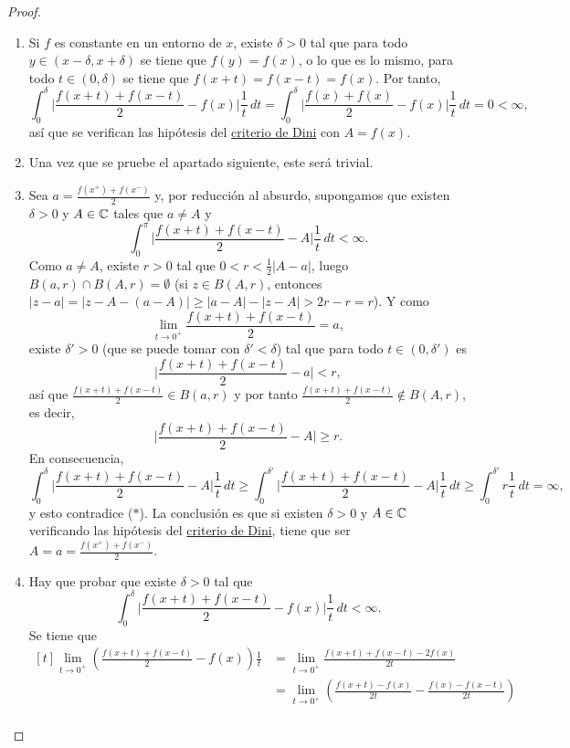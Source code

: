 \documentclass[a4paper, 11pt, oneside]{report}
\begin{document}
\begin{proof}
  \hfill
  \begin{enumerate}
    \item Si $f$ es constante en un entorno de $x$, existe $\delta>0$ tal que para todo $y \in (x-\delta,x+\delta)$ se tiene que $f(y)=f(x)$, o lo que es lo mismo, para todo $t \in (0,\delta)$ se tiene que $f(x+t)=f(x-t)=f(x)$. Por tanto,
    \[\int_0^\delta \biggl|\frac{f(x+t)+f(x-t)}{2}-f(x)\biggr| \frac{1}{t} \, dt = \int_0^\delta \biggl|\frac{f(x)+f(x)}{2}-f(x)\biggr|\frac{1}{t} \, dt = 0 < \infty,\]
    así que se verifican las hipótesis del \hyperref[teo:4.2.3]{\color{c1}criterio de Dini} con $A = f(x)$.
    \item Una vez que se pruebe el apartado siguiente, este será trivial.
    \item Sea $a = \frac{f(x^+)+f(x^-)}{2}$ y, por reducción al absurdo, supongamos que existen $\delta > 0$ y $A \in \mathbb C$ tales que $a \neq A$ y
    \[\int_0^\pi \biggl|\frac{f(x+t)+f(x-t)}{2}-A\biggr|\frac{1}{t} \, dt < \infty. \tag{$\ast$}\]
    Como $a \neq A$, existe $r > 0$ tal que $0 < r < \frac{1}{2}|A-a|$, luego $B(a,r) \cap B(A,r) = \emptyset$ (si $z \in B(A,r)$, entonces $|z-a| =|z-A-(a-A)| \geq |a-A|-|z-A| > 2r-r = r$). Y como
    \[\lim_{t \to 0^+} \frac{f(x+t)+f(x-t)}{2} = a,\]
    existe $\delta' > 0$ (que se puede tomar con $\delta' < \delta$) tal que para todo $t \in (0,\delta')$ es
    \[\biggl|\frac{f(x+t)+f(x-t)}{2}-a\biggr| < r,\]
    así que $\frac{f(x+t)+f(x-t)}{2} \in B(a,r)$ y por tanto $\frac{f(x+t)+f(x-t)}{2} \not \in B(A,r)$, es decir, 
    \[\biggl|\frac{f(x+t)+f(x-t)}{2}-A\biggr| \geq r.\]
    En consecuencia,
    \[\int_0^\delta\biggl|\frac{f(x+t)+f(x-t)}{2}-A\biggr| \frac{1}{t} \, dt \geq \int_0^{\delta'}\biggl|\frac{f(x+t)+f(x-t)}{2}-A\biggr| \frac{1}{t} \, dt \geq \int_0^{\delta'}r \frac{1}{t} \, dt = \infty,\]
    y esto contradice ($\ast$). La conclusión es que si existen $\delta > 0$ y $A \in \mathbb C$ verificando las hipótesis del \hyperref[teo:4.2.3]{\color{c1}criterio de Dini}, tiene que ser $A = a = \frac{f(x^+)+f(x^-)}{2}$.
    \item Hay que probar que existe $\delta > 0$ tal que
    \[\int_0^\delta \biggl|\frac{f(x+t)+f(x-t)}{2}-f(x)\biggr| \frac{1}{t} \, dt < \infty.\]
    Se tiene que
    \[\begin{aligned}[t]
      \lim_{t \to 0^+} \left(\frac{f(x+t)+f(x-t)}{2}-f(x)\right)\frac{1}{t} &= \lim_{t \to 0^+} \frac{f(x+t)+f(x-t)-2f(x)}{2t} \\
      &= \lim_{t \to 0^+} \left(\frac{f(x+t)-f(x)}{2t} - \frac{f(x)-f(x-t)}{2t}\right) \\

\end{aligned}\]
\end{enumerate}
\end{proof}
\end{document}
